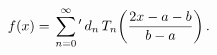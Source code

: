 \[f(x)=\sideset{}{{}^{\prime}}{\sum}_{n=0}^{\infty}d_{n}\mathop{T_{n}\/}%
\nolimits\!\left(\frac{2x-a-b}{b-a}\right).\]